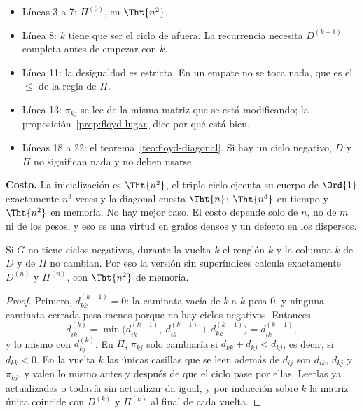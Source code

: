\documentclass[11pt,letterpaper]{article}
\begin{document}
\begin{itemize}[itemsep=0.1em]
  \item Líneas 3 a 7: $\Pi^{(0)}$, en $\Tht{n^2}$.
  \item Línea 8: $k$ tiene que ser el ciclo de afuera. La recurrencia
        necesita $D^{(k-1)}$ completa antes de empezar con $k$.
  \item Línea 11: la desigualdad es estricta. En un empate no se toca
        nada, que es el $\le$ de la regla de $\Pi$.
  \item Línea 13: $\pi_{kj}$ se lee de la misma matriz que se está
        modificando; la proposición~\ref{prop:floyd-lugar} dice por qué
        está bien.
  \item Líneas 18 a 22: el teorema~\ref{teo:floyd-diagonal}. Si hay un
        ciclo negativo, $D$ y $\Pi$ no significan nada y no deben
        usarse.
\end{itemize}

\textbf{Costo.} La inicialización es $\Tht{n^2}$, el triple ciclo
ejecuta su cuerpo de $\Ord{1}$ exactamente $n^3$ veces y la diagonal
cuesta $\Tht{n}$: $\Tht{n^3}$ en tiempo y $\Tht{n^2}$ en memoria. No
hay mejor caso. El costo depende solo de $n$, no de $m$ ni de los
pesos, y eso es una virtud en grafos densos y un defecto en los
dispersos.

\begin{proposicion}
  \label{prop:floyd-lugar}
  Si $G$ no tiene ciclos negativos, durante la vuelta $k$ el renglón
  $k$ y la columna $k$ de $D$ y de $\Pi$ no cambian. Por eso la versión
  sin superíndices calcula exactamente $D^{(n)}$ y $\Pi^{(n)}$, con
  $\Tht{n^2}$ de memoria.
\end{proposicion}

\begin{proof}
  Primero, $d^{(k-1)}_{kk} = 0$: la caminata vacía de $k$ a $k$ pesa
  $0$, y ninguna caminata cerrada pesa menos porque no hay ciclos
  negativos. Entonces
  \[
    d^{(k)}_{ik} = \min\bigl(d^{(k-1)}_{ik},\
                   d^{(k-1)}_{ik} + d^{(k-1)}_{kk}\bigr)
                 = d^{(k-1)}_{ik} ,
  \]
  y lo mismo con $d^{(k)}_{kj}$. En $\Pi$, $\pi_{kj}$ solo cambiaría si
  $d_{kk} + d_{kj} < d_{kj}$, es decir, si $d_{kk} < 0$. En la vuelta
  $k$ las únicas casillas que se leen además de $d_{ij}$ son $d_{ik}$,
  $d_{kj}$ y $\pi_{kj}$, y valen lo mismo antes y después de que el
  ciclo pase por ellas. Leerlas ya actualizadas o todavía sin
  actualizar da igual, y por inducción sobre $k$ la matriz única
  coincide con $D^{(k)}$ y $\Pi^{(k)}$ al final de cada vuelta.
\end{proof}
\end{document}
